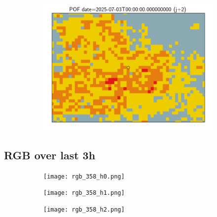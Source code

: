 \documentclass{article}
\begin{document}
\begin{figure}[H]
\begin{subfigure}[b]{0.31\textwidth}
    \end{subfigure}
    \begin{subfigure}[b]{0.36\textwidth}
        \centering
        \includegraphics[width=0.85\linewidth]{pof_358_j2.png} %
    \end{subfigure}
\end{figure}


\vspace{-1em}
\subsection*{RGB over last 3h}
\vspace{-1em}
\begin{figure}[H]
    \centering
    \begin{subfigure}[b]{0.32\textwidth}
        \centering
        \texttt{[image: rgb\_358\_h0.png]} %
    \end{subfigure}
    \begin{subfigure}[b]{0.32\textwidth}
        \centering
        \texttt{[image: rgb\_358\_h1.png]} %
    \end{subfigure}
    \begin{subfigure}[b]{0.32\textwidth}
        \centering
        \texttt{[image: rgb\_358\_h2.png]} %
    \end{subfigure}
\end{figure}
\end{document}
